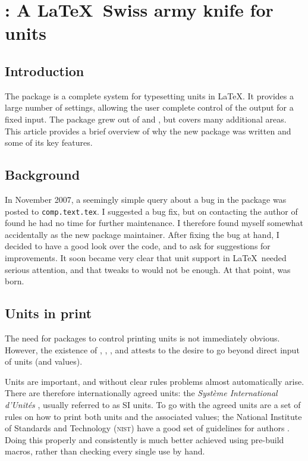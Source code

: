 \section{: A \LaTeX\ Swiss army knife for units}
\begin{bibunit}

\subsection{Introduction}
The  package is a complete system for typesetting
units in \LaTeX.  It provides a large number of settings,
allowing the user complete control of the output for a fixed
input.  The package grew out of  and
, but covers many additional areas.  This article
provides a brief overview of why the new package was written
and some of its key features.

\subsection{Background}

In November 2007, a seemingly simple query about a bug in the
 package \cite{Heldorn2007} was posted to
\texttt{comp.text.tex}. I suggested a bug fix, but on
contacting the author of  found he had no time for
further maintenance.  I therefore found myself somewhat
accidentally as the new package maintainer.  After fixing the
bug at hand, I decided to have a good look over the code, and
to ask for suggestions for improvements.  It soon became very
clear that unit support in \LaTeX\ needed serious attention,
and that tweaks to  would not be enough.  At that
point,  was born.

\subsection{Units in print}

The need for packages to control printing units is not
immediately obvious.  However, the existence of ,
 \cite{Els2006}, 
\cite{Bauke2007},  \cite{Happel2005} and
 \cite{Reichert1998} attests to the desire to go
beyond direct input of units (and values).

Units are important, and without clear rules problems almost
automatically arise.  There are therefore internationally
agreed units: the \emph{Syst\`eme International d'Unit\'es}
\cite{BIPM2008}, usually referred to as SI units.  To go with
the agreed units are a set of rules on how to print both units
and the associated values; the National Institute of Standards and Technology (\textsc{nist}) have a good set of
guidelines for authors \cite{NIST2008}.  Doing this properly
and consistently is much better achieved using pre-build
macros, rather than checking every single use by hand.


\end{bibunit}
